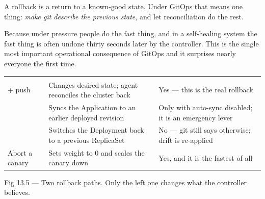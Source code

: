 
 A rollback is a return to a known-good state. Under GitOps that means one thing: \emph{make git describe the previous state}, and let reconciliation do the rest.

 Because under pressure people do the fast thing, and in a self-healing system the fast thing is often undone thirty seconds later by the controller. This is the single most important operational consequence of GitOps and it surprises nearly everyone the first time.

\begin{center}\small
\wbrowcolors
\begin{tabularx}{\linewidth}{@{}L{34mm} X L{24mm}@{}}
 &  & \\
 + push & Changes desired state; agent reconciles the cluster back & Yes --- this is the real rollback\\
 & Syncs the Application to an earlier deployed revision & Only with auto-sync disabled; it is an emergency lever\\
 & Switches the Deployment back to a previous ReplicaSet & No --- git still says otherwise; drift is re-applied\\
Abort a canary & Sets weight to 0 and scales the canary down & Yes, and it is the fastest of all\\
\end{tabularx}
\end{center}

\begin{wbfigure}{Fig 13.5 — Two rollback paths. Only the left one changes what the controller believes.}
\end{wbfigure}

